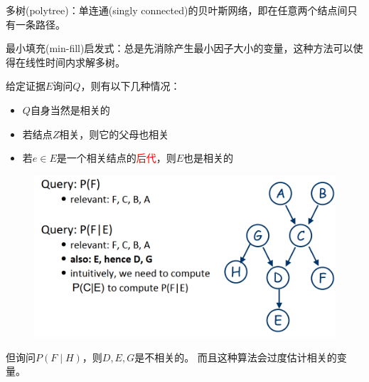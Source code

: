多树(polytree)：单连通(singly connected)的贝叶斯网络，即在任意两个结点间只有一条路径。

最小填充(min-fill)启发式：总是先消除产生最小因子大小的变量，这种方法可以使得在线性时间内求解多树。

\begin{definition}
给定证据$E$询问$Q$，则有以下几种情况：
\begin{itemize}
	\item $Q$自身当然是相关的
	\item 若结点$Z$相关，则它的父母也相关
	\item 若$e\in E$是一个相关结点的\textcolor{red}{后代}，则$E$也是相关的
\end{itemize}
\end{definition}
\begin{example}
\begin{figure}[H]
\centering
\includegraphics[width=0.8\linewidth]{fig/relevance_example.png}
\end{figure}
但询问$P(F\mid H)$，则$D,E,G$是不相关的。
而且这种算法会过度估计相关的变量。
\end{example}